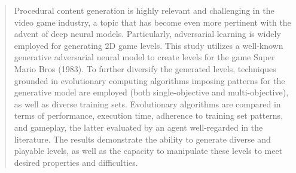 \begin{abstract}

Procedural content generation is highly relevant and challenging in the video game industry, a topic that has become even more pertinent with the advent of deep neural models. Particularly, adversarial learning is widely employed for generating 2D game levels. This study utilizes a well-known generative adversarial neural model to create levels for the game Super Mario Bros (1983). To further diversify the generated levels, techniques grounded in evolutionary computing algorithms imposing patterns for the generative model are employed (both single-objective and multi-objective), as well as diverse training sets. Evolutionary algorithms are compared in terms of performance, execution time, adherence to training set patterns, and gameplay, the latter evaluated by an agent well-regarded in the literature. The results demonstrate the ability to generate diverse and playable levels, as well as the capacity to manipulate these levels to meet desired properties and difficulties.

\end{abstract}
